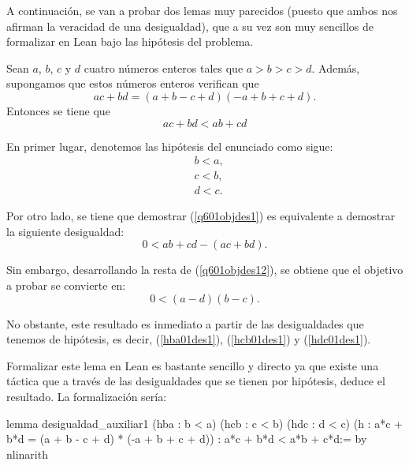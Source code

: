 A continuación, se van a probar dos lemas muy parecidos (puesto que
ambos nos afirman la veracidad de una desigualdad), que a su vez son muy
sencillos de formalizar en Lean bajo las hipótesis del problema.

\begin{lema}\label{lemades1}
  Sean \(a\), \(b\), \(c\) y \(d\) cuatro números enteros tales que
  \(a > b > c > d \). Además, supongamos que
  estos números enteros verifican que
    \begin{equation}\tag{h}
      ac+bd = (a+b-c+d)(-a+b+c+d).
    \end{equation}
    Entonces se tiene que
    \begin{equation}\label{q601objdes1}
      ac+bd < ab+cd
    \end{equation}
\end{lema}

\begin{demostracion}
    En primer lugar, denotemos las hipótesis del enunciado como sigue:
  \begin{align}
    &b<a,\tag{hba}\label{hba01des1}\\
    &c<b,\tag{hcb}\label{hcb01des1}\\
    &d<c.\tag{hdc}\label{hdc01des1}
  \end{align}

  Por otro lado, se tiene que demostrar (\ref{q601objdes1}) es
  equivalente a demostrar la siguiente desigualdad:
  \begin{equation}\label{q601objdes12}
      0<ab+cd-(ac+bd).
  \end{equation}

  Sin embargo, desarrollando la resta de (\ref{q601objdes12}), se
  obtiene que el objetivo a probar se convierte en:
  \begin{equation}\label{q601objdes13}
      0<(a-d)(b-c).
  \end{equation}

  No obstante, este resultado es inmediato a partir de las desigualdades
  que tenemos de hipótesis, es decir, (\ref{hba01des1}),
  (\ref{hcb01des1}) y (\ref{hdc01des1}).
\end{demostracion}

Formalizar este lema en Lean es bastante sencillo y directo ya que
existe una táctica que a través de las desigualdades que se tienen por
hipótesis, deduce el resultado. La formalización sería:
\begin{leancode}
lemma desigualdad_auxiliar1
  (hba : b < a)
  (hcb : c < b)
  (hdc : d < c)
  (h : a*c + b*d = (a + b - c + d) * (-a + b + c + d))
  : a*c + b*d < a*b + c*d:=
by nlinarith
\end{leancode}

